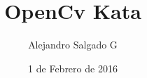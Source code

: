 \documentclass{beamer}
\begin{document}
    \title{OpenCv Kata}
    \author{Alejandro Salgado G}
    \date{1 de Febrero de 2016}

    \frame{ \titlepage }

    
    
    
    
\end{document}
